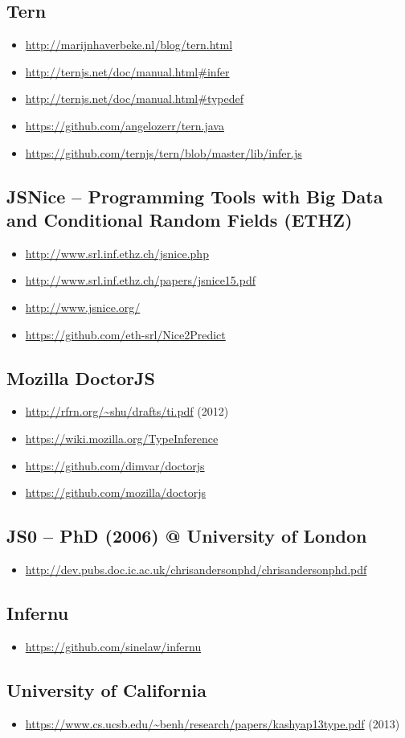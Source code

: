 \subsection{Tern}
\begin{itemize}
 \item \url{http://marijnhaverbeke.nl/blog/tern.html}
 \item \url{http://ternjs.net/doc/manual.html#infer}
 \item \url{http://ternjs.net/doc/manual.html#typedef}
 \item \url{https://github.com/angelozerr/tern.java}
 \item \url{https://github.com/ternjs/tern/blob/master/lib/infer.js}
\end{itemize}

\subsection{JSNice -- Programming Tools with Big Data and Conditional Random Fields (ETHZ)}
\begin{itemize}
 \item \url{http://www.srl.inf.ethz.ch/jsnice.php}
 \item \url{http://www.srl.inf.ethz.ch/papers/jsnice15.pdf}
 \item \url{http://www.jsnice.org/}
 \item \url{https://github.com/eth-srl/Nice2Predict}
\end{itemize}

\subsection{Mozilla DoctorJS}
\begin{itemize}
\item \url{http://rfrn.org/~shu/drafts/ti.pdf} (2012)
\item \url{https://wiki.mozilla.org/TypeInference}
\item \url{https://github.com/dimvar/doctorjs}
\item \url{https://github.com/mozilla/doctorjs}
\end{itemize}

\subsection{JS0 -- PhD (2006) @ University of London}
\begin{itemize}
 \item \url{http://dev.pubs.doc.ic.ac.uk/chrisandersonphd/chrisandersonphd.pdf}
\end{itemize}

\subsection{Infernu}
\begin{itemize}
 \item \url{https://github.com/sinelaw/infernu}
\end{itemize}

\subsection{University of California}
\begin{itemize}
 \item \url{https://www.cs.ucsb.edu/~benh/research/papers/kashyap13type.pdf} (2013)
\end{itemize}
